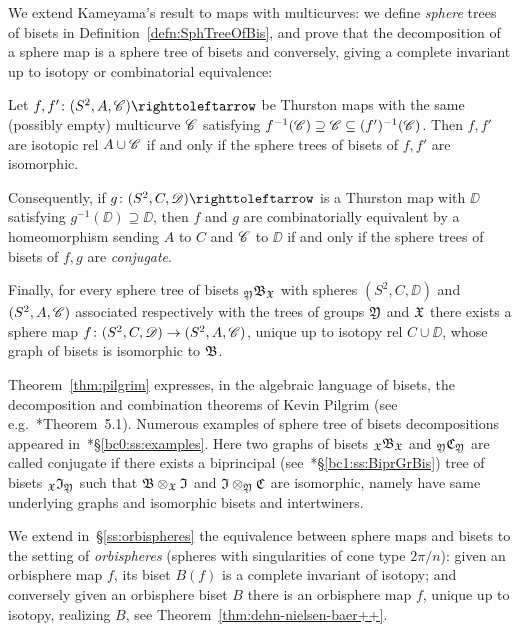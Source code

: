\documentclass{amsart}
\begin{document}
We extend Kameyama's result to maps with multicurves: we define
\emph{sphere} trees of bisets in Definition~\ref{defn:SphTreeOfBis},
and prove that the decomposition of a sphere map is a sphere tree of
bisets and conversely, giving a complete invariant up to isotopy or
combinatorial equivalence:
\begin{mainthm}\label{thm:pilgrim}
  Let $f,f'\colon(S^2,A,\CC)\selfmap$ be Thurston maps with the same
  (possibly empty) multicurve ${\mathscr C}$ satisfying
  $f^{-1}({\mathscr C})\supseteq{\mathscr C}\subseteq (f')^{-1}({\mathscr C})$. Then $f,f'$ are
  isotopic rel $A\cup{\mathscr C}$ if and only if the sphere trees of bisets of
  $f,f'$ are isomorphic.

  Consequently, if $g\colon(S^2,C,\DD)\selfmap$ is a Thurston map with
  $\DD$ satisfying $g^{-1}(\DD)\supseteq\DD$, then $f$ and $g$ are
  combinatorially equivalent by a homeomorphism sending $A$ to $C$ and
  ${\mathscr C}$ to $\DD$ if and only if the sphere trees of bisets of $f,g$
  are \emph{conjugate}.

  Finally, for every sphere tree of bisets
  $\subscript\gfY\gfB_\gf$ with spheres
  $(S^2,C,\DD)$ and $(S^2,A,{\mathscr C})$ associated respectively with the
  trees of groups ${\mathfrak Y}$ and ${\mathfrak X}$ there exists a sphere map
  $f\colon(S^2,C,{\mathscr D})\to(S^2,A,{\mathscr C})$, unique up to isotopy rel
  $C\cup\DD$, whose graph of bisets is isomorphic to ${\mathfrak B}$.
\end{mainthm}

Theorem~\ref{thm:pilgrim} expresses, in the algebraic language of
bisets, the decomposition and combination theorems of Kevin Pilgrim
(see e.g.~\cite{pilgrim:combinations}*{Theorem~5.1}). Numerous
examples of sphere tree of bisets decompositions appeared
in~\cite{bartholdi-dudko:bc0}*{\S\ref{bc0:ss:examples}}.  Here two
graphs of bisets $\subscript\gf\gfB_\gf$ and $\subscript\gfY\gfC_\gfY$
are called conjugate if there exists a biprincipal
(see~\cite{bartholdi-dudko:bc1}*{\S\ref{bc1:ss:BiprGrBis}}) tree of
bisets $\subscript\gf\gfI_\gfY$ such that ${\mathfrak B}\otimes_{\mathfrak X}{\mathfrak I}$ and
${\mathfrak I}\otimes_{\mathfrak Y}{\mathfrak C}$ are isomorphic, namely have same underlying
graphs and isomorphic bisets and intertwiners.

We extend in~\S\ref{ss:orbispheres} the equivalence between sphere
maps and bisets to the setting of \emph{orbispheres} (spheres with
singularities of cone type $2\pi/n$): given an orbisphere map $f$, its
biset $B(f)$ is a complete invariant of isotopy; and conversely given
an orbisphere biset $B$ there is an orbisphere map $f$, unique up to
isotopy, realizing $B$, see Theorem~\ref{thm:dehn-nielsen-baer++}.
\end{document}
